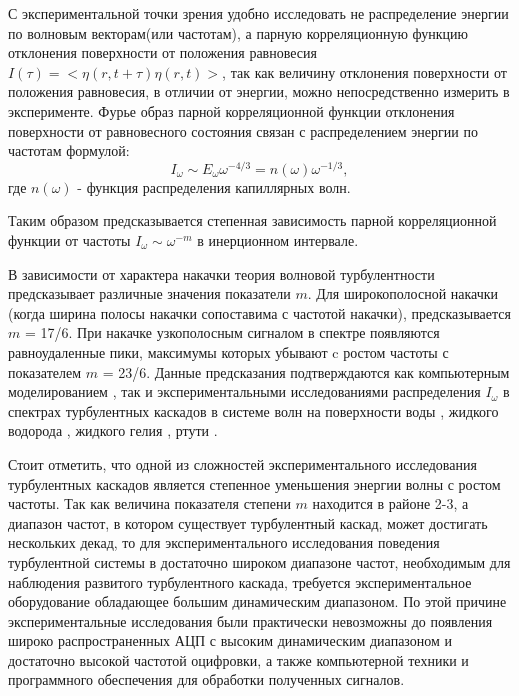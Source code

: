С экспериментальной точки зрения удобно исследовать не распределение энергии по волновым векторам(или частотам), а парную корреляционную функцию отклонения поверхности от положения равновесия $I(\tau)=<\eta(r, t+\tau)\eta(r,t)>$, так как величину отклонения поверхности от положения равновесия, в отличии от энергии, можно непосредственно измерить в эксперименте. Фурье образ парной корреляционной функции отклонения поверхности от равновесного состояния связан с распределением энергии по частотам формулой:
\begin{equation}
\label{eq:EOmegaI}
I_\omega \sim E_\omega \omega^{-4/3} = n(\omega) \omega^{-1/3},
\end{equation}
где $n(\omega)$ - функция распределения капиллярных волн.

Таким образом предсказывается степенная зависимость парной корреляционной функции от частоты $I_\omega \sim \omega^{-m}$ в инерционном интервале.

В зависимости от характера накачки теория волновой турбулентности предсказывает различные значения показатели $m$. Для широкополосной накачки (когда ширина полосы накачки сопоставима с  частотой накачки), предсказывается $m$ = 17/6. При накачке узкополосным сигналом в спектре появляются равноудаленные пики, максимумы которых убывают c ростом частоты с показателем $m$ = 23/6. Данные предсказания подтверждаются как компьютерным моделированием \cite{Babiano1995, Babiano1987, Falcovich1988, Pushkarev1996}, так и экспериментальными исследованиями распределения $I_\omega$
в спектрах турбулентных каскадов в системе волн на поверхности воды \cite{BrazhnikovWater}, жидкого водорода \cite{Brazhnikov2001}, жидкого гелия \cite{Abdurakhimov2007}, ртути \cite{Falcon2007}.

Стоит отметить, что одной из сложностей экспериментального исследования турбулентных каскадов является степенное уменьшения энергии волны с ростом частоты. Так как величина показателя степени $m$ находится в районе 2-3, а диапазон частот, в котором существует турбулентный каскад, может достигать нескольких декад, то для экспериментального исследования поведения турбулентной системы в достаточно широком диапазоне частот, необходимым для наблюдения развитого турбулентного каскада, требуется экспериментальное оборудование обладающее большим динамическим диапазоном. По этой причине экспериментальные исследования были практически невозможны до появления широко распространенных АЦП с высоким динамическим диапазоном и достаточно высокой частотой оцифровки, а также компьютерной техники и программного обеспечения для обработки полученных сигналов.

